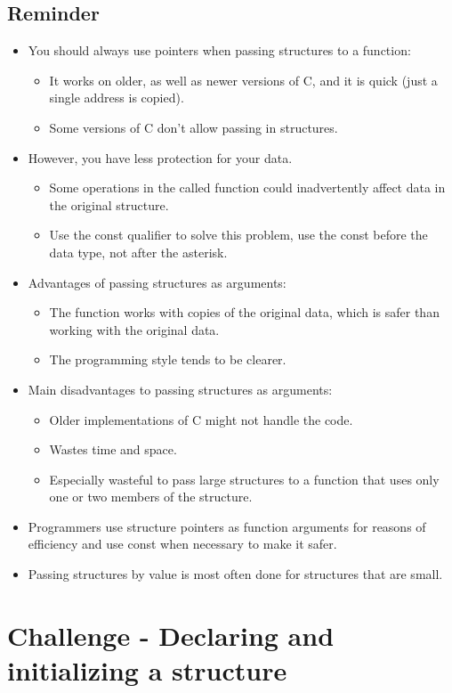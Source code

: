 \subsection{Reminder}
\begin{itemize}
    \item You should always use pointers when passing structures to a function:
        \begin{itemize}
            \item It works on older, as well as newer versions of C, and it is quick (just a single address is copied).
            \item Some versions of C don't allow passing in structures.
        \end{itemize}
    
    \item However, you have less protection for your data.
        \begin{itemize}
            \item Some operations in the called function could inadvertently affect data in the original structure.
            \item Use the const qualifier to solve this problem, use the const before the data type, not after the asterisk. 
        \end{itemize}
    
    \item Advantages of passing structures as arguments:
        \begin{itemize}
            \item The function works with copies of the original data, which is safer than working with the original data.
            \item The programming style tends to be clearer. 
        \end{itemize}
    
    \item Main disadvantages to passing structures as arguments:
        \begin{itemize}
            \item Older implementations of C might not handle the code. 
            \item Wastes time and space. 
            \item Especially wasteful to pass large structures to a function that uses only one or two members of the structure.
        \end{itemize}
    
    \item Programmers use structure pointers as function arguments for reasons of efficiency and use const when necessary to make it safer.
    \item Passing structures by value is most often done for structures that are small.
\end{itemize}


\section{Challenge - Declaring and initializing a structure}





